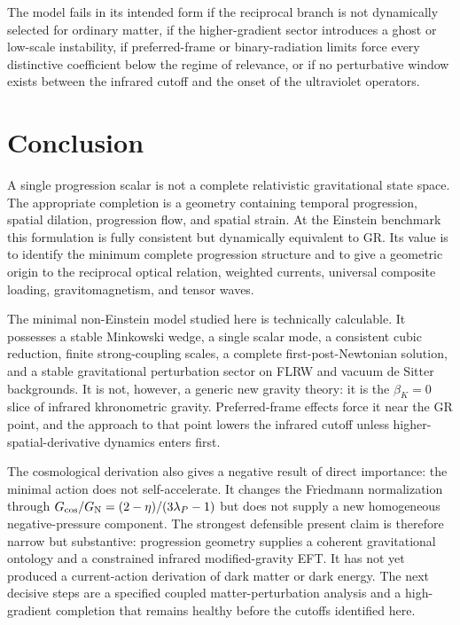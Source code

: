 \documentclass[11pt]{article}
\newcommand{\GN}{G_{\rm N}}
\newcommand{\Gc}{G_{\rm cos}}
\begin{document}
The model fails in its intended form if the reciprocal branch is not dynamically selected for ordinary matter, if the higher-gradient sector introduces a ghost or low-scale instability, if preferred-frame or binary-radiation limits force every distinctive coefficient below the regime of relevance, or if no perturbative window exists between the infrared cutoff and the onset of the ultraviolet operators.

\section{Conclusion}

A single progression scalar is not a complete relativistic gravitational state space.  The appropriate completion is a geometry containing temporal progression, spatial dilation, progression flow, and spatial strain.  At the Einstein benchmark this formulation is fully consistent but dynamically equivalent to GR.  Its value is to identify the minimum complete progression structure and to give a geometric origin to the reciprocal optical relation, weighted currents, universal composite loading, gravitomagnetism, and tensor waves.

The minimal non-Einstein model studied here is technically calculable.  It possesses a stable Minkowski wedge, a single scalar mode, a consistent cubic reduction, finite strong-coupling scales, a complete first-post-Newtonian solution, and a stable gravitational perturbation sector on FLRW and vacuum de Sitter backgrounds.  It is not, however, a generic new gravity theory: it is the $\beta_K=0$ slice of infrared khronometric gravity.  Preferred-frame effects force it near the GR point, and the approach to that point lowers the infrared cutoff unless higher-spatial-derivative dynamics enters first.

The cosmological derivation also gives a negative result of direct importance: the minimal action does not self-accelerate.  It changes the Friedmann normalization through $\Gc/\GN=(2-\eta)/(3\lambda_P-1)$ but does not supply a new homogeneous negative-pressure component.  The strongest defensible present claim is therefore narrow but substantive: progression geometry supplies a coherent gravitational ontology and a constrained infrared modified-gravity EFT.  It has not yet produced a current-action derivation of dark matter or dark energy.  The next decisive steps are a specified coupled matter-perturbation analysis and a high-gradient completion that remains healthy before the cutoffs identified here.
\end{document}
